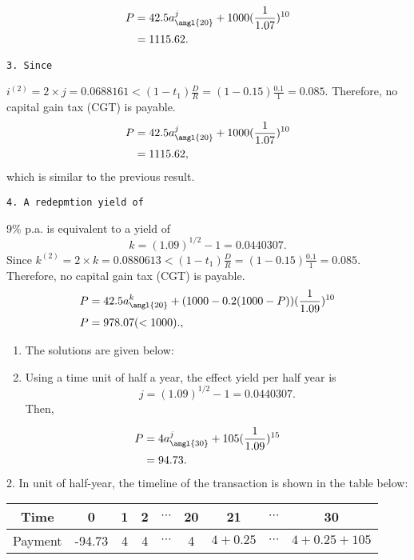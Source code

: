 \documentclass[
]{article}
\theoremstyle{definition}
\theoremstyle{definition}
\theoremstyle{definition}
\theoremstyle{definition}
\theoremstyle{remark}
\begin{document}
\[
\begin{aligned}
P &= 42.5 a^j_{\angl{20}} + 1000 (\frac{1}{1.07})^{10} \\
&= 1115.62.
\end{aligned}
\]

\begin{verbatim}
3. Since 
\end{verbatim}

\(i^{(2)} = 2 \times j = 0.0688161 < (1 - t_1)\frac{D}{R} = (1 - 0.15)\frac{0.1}{1} = 0.085.\)
Therefore, no capital gain tax (CGT) is payable.
\[
\begin{aligned}
P &= 42.5 a^j_{\angl{20}} + 1000 (\frac{1}{1.07})^{10} \\
&= 1115.62,
\end{aligned}
\]
which is similar to the previous result.

\begin{verbatim}
4. A redepmtion yield of 
\end{verbatim}

9\% p.a. is equivalent to a yield of
\[k = (1.09)^{1/2} - 1 = 0.0440307.\]
Since \(k^{(2)} = 2 \times k = 0.0880613 < (1 - t_1)\frac{D}{R} = (1 - 0.15)\frac{0.1}{1} = 0.085.\)
Therefore, no capital gain tax (CGT) is payable.
\[
\begin{aligned}
P &= 42.5 a^k_{\angl{20}} + (1000 - 0.2(1000-P)) (\frac{1}{1.09})^{10} \\
P &= 978.07 (< 1000).,
\end{aligned}
\]

\begin{enumerate}
\def\labelenumi{\arabic{enumi}.}
\setcounter{enumi}{2}
\item
  The solutions are given below:
\item
  Using a time unit of half a year, the effect yield per half year is
  \[j = (1.09)^{1/2} - 1 = 0.0440307.\]
  Then,
\end{enumerate}

\[
\begin{aligned}
P &= 4 a^j_{\angl{30}} + 105 (\frac{1}{1.09})^{15} \\
&= 94.73.
\end{aligned}
\]
2. In unit of half-year, the timeline of the transaction is shown in the table below:

\begin{longtable}[]{@{}ccccccccc@{}}
\toprule
Time & 0 & 1 & 2 & \(\cdots\) & 20 & 21 & \(\cdots\) & 30 \\
\midrule
\endhead
Payment & -94.73 & 4 & 4 & \(\cdots\) & 4 & \(4 + 0.25\) & \(\cdots\) & \(4 + 0.25 + 105\) \\
\bottomrule
\end{longtable}
\end{document}
